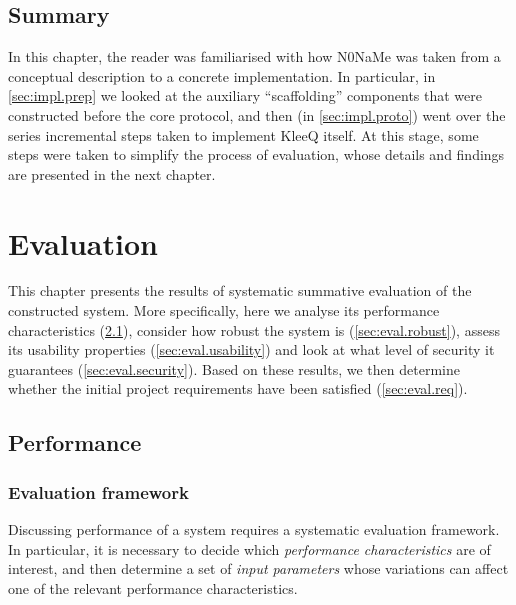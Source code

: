 \documentclass[a4paper, 12pt]{report}
\newcommand{\funkytt}{\fontfamily{AnonymousPro}\selectfont}
\begin{document}
\section{Summary}
In this chapter, the reader was familiarised with how {\funkytt N0NaMe} was taken from a conceptual description to a concrete implementation. In particular, in \cref{sec:impl.prep} we looked at the auxiliary ``scaffolding'' components that were constructed before the core protocol, and then (in \cref{sec:impl.proto}) went over the series incremental steps taken to implement KleeQ itself. At this stage, some steps were taken to simplify the process of evaluation, whose details and findings are presented in the next chapter.

\chapter{Evaluation}
This chapter presents the results of systematic summative evaluation of the constructed system. More specifically, here we analyse its performance characteristics (\cref{sec:eval.perf}), consider how robust the system is (\cref{sec:eval.robust}), assess its usability properties (\cref{sec:eval.usability}) and look at what level of security it guarantees (\cref{sec:eval.security}). Based on these results, we then determine whether the initial project requirements have been satisfied (\cref{sec:eval.req}).


\section{Performance}
\label{sec:eval.perf}
\subsection{Evaluation framework}
\label{subsec:eval.pef.frame}
Discussing performance of a system requires a systematic evaluation framework. 
In particular, it is necessary to decide which \emph{performance characteristics} are of interest, and then determine a set of \emph{input parameters} whose variations can affect one of the relevant performance characteristics. \\
\end{document}
